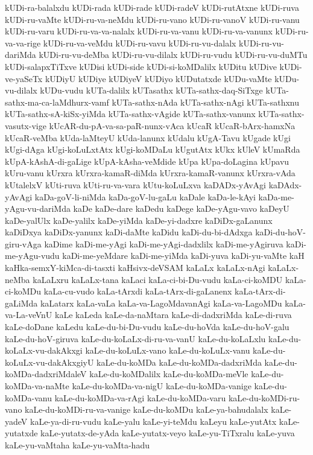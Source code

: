 {kUDi-ra-balalxdu
kUDi-rada
kUDi-rade
kUDi-radeV
kUDi-rutAtxne
kUDi-ruva
kUDi-ru-vaMte
kUDi-ru-va-neMdu
kUDi-ru-vano
kUDi-ru-vanoV
kUDi-ru-vanu
kUDi-ru-varu
kUDi-ru-va-va-nalalx
kUDi-ru-va-vanu
kUDi-ru-va-vanunx
kUDi-ru-va-va-rige
kUDi-ru-va-veMdu
kUDi-ru-vavu
kUDi-ru-vu-dalalx
kUDi-ru-vu-dariMda
kUDi-ru-vu-deMba
kUDi-ru-vu-dilalx
kUDi-ru-vudu
kUDi-ru-vu-duMTu
kUDi-salapxTiTxve
kUDisi
kUDi-side
kUDi-si-koMDalilx
kUDitu
kUDive
kUDi-ve-yaSeTx
kUDiyU
kUDiye
kUDiyeV
kUDiyo
kUDutatxde
kUDu-vaMte
kUDu-vu-dilalx
kUDu-vudu
kUTa-dalilx
kUTasathx
kUTa-sathx-daq-SiTxge
kUTa-sathx-ma-ca-laMdhurx-vamf
kUTa-sathx-nAda
kUTa-sathx-nAgi
kUTa-sathxnu
kUTa-sathx-sA-kiSx-yiMda
kUTa-sathx-vAgide
kUTa-sathx-vanunx
kUTa-sathx-vasutx-vige
kUcAR-du-pA-va-sa-paR-nunx-vAca
kUcaR
kUcaR-bArx-hamxNa
kUcaR-veMba
kUda-laMteyU
kUda-lanunx
kUdalu
kUgA-Tavu
kUgade
kUgi
kUgi-dAga
kUgi-koLuLxtAtx
kUgi-koMDaLu
kUgutAtx
kUkx
kUleV
kUmaRda
kUpA-kAshA-di-gaLige
kUpA-kAsha-veMdide
kUpa
kUpa-doLagina
kUpavu
kUru-vanu
kUrxra
kUrxra-kamaR-diMda
kUrxra-kamaR-vanunx
kUrxra-vAda
kUtalelxV
kUti-ruva
kUti-ru-va-vara
kUtu-koLuLxva
kaDADx-yAvAgi
kaDAdx-yAvAgi
kaDa-goV-li-niMda
kaDa-goV-lu-gaLu
kaDale
kaDa-le-kAyi
kaDa-me-yAgu-vu-dariMda
kaDe
kaDe-dare
kaDedu
kaDege
kaDe-yAgu-vavo
kaDeyU
kaDe-yalUlx
kaDe-yalilx
kaDe-yiMda
kaDe-yi-dadxre
kaDiDx-gaLanunx
kaDiDxya
kaDiDx-yanunx
kaDi-daMte
kaDidu
kaDi-du-bi-dAdxga
kaDi-du-hoV-giru-vAga
kaDime
kaDi-me-yAgi
kaDi-me-yAgi-dadxlilx
kaDi-me-yAgiruva
kaDi-me-yAgu-vudu
kaDi-me-yeMdare
kaDi-me-yiMda
kaDi-yuva
kaDi-yu-vaMte
kaH
kaHka-semxY-kiMca-di-tasxti
kaHsivx-deVSAM
kaLaLx
kaLaLx-nAgi
kaLaLx-neMba
kaLaLxru
kaLaLx-tana
kaLaci
kaLa-ci-bi-Du-vudu
kaLa-ci-koMDU
kaLa-ci-koMDu
kaLa-cu-vudo
kaLa-tArxdi
kaLa-tArx-di-gaLanenx
kaLa-tArx-di-gaLiMda
kaLatarx
kaLa-vaLa
kaLa-va-LagoMdavanAgi
kaLa-va-LagoMDu
kaLa-va-La-veVnU
kaLe
kaLeda
kaLe-da-naMtara
kaLe-di-dadxriMda
kaLe-di-ruva
kaLe-doDane
kaLedu
kaLe-du-bi-Du-vudu
kaLe-du-hoVda
kaLe-du-hoV-galu
kaLe-du-hoV-giruva
kaLe-du-koLaLx-di-ru-va-vanU
kaLe-du-koLaLxlu
kaLe-du-koLaLx-vu-dakAkxgi
kaLe-du-koLuLx-vano
kaLe-du-koLuLx-vanu
kaLe-du-koLuLx-vu-dakAkxgiyU
kaLe-du-koMDa
kaLe-du-koMDa-dadxriMda
kaLe-du-koMDa-dadxriMdaleV
kaLe-du-koMDalilx
kaLe-du-koMDa-meVle
kaLe-du-koMDa-va-naMte
kaLe-du-koMDa-va-nigU
kaLe-du-koMDa-vanige
kaLe-du-koMDa-vanu
kaLe-du-koMDa-va-rAgi
kaLe-du-koMDa-varu
kaLe-du-koMDi-ru-vano
kaLe-du-koMDi-ru-va-vanige
kaLe-du-koMDu
kaLe-ya-bahudalalx
kaLe-yadeV
kaLe-ya-di-ru-vudu
kaLe-yalu
kaLe-yi-teMdu
kaLeyu
kaLe-yutAtx
kaLe-yutatxde
kaLe-yutatx-de-yAda
kaLe-yutatx-veyo
kaLe-yu-TiTxralu
kaLe-yuva
kaLe-yu-vaMtaha
kaLe-yu-vaMta-hadu
}
